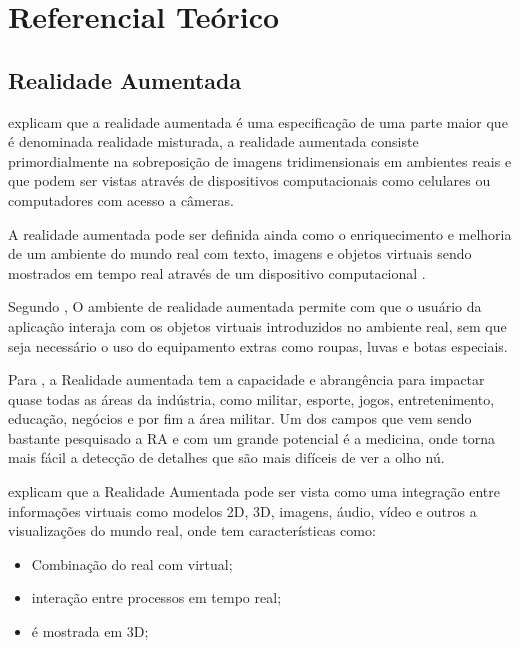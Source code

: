 \chapter{Referencial Teórico}\label{cap:referencial_teorico}

\section{Realidade Aumentada}
	 explicam que a realidade aumentada é uma especificação de uma parte maior que é denominada realidade misturada, a realidade aumentada consiste primordialmente na sobreposição de imagens tridimensionais em ambientes reais e que podem ser vistas através de dispositivos computacionais como celulares ou computadores com acesso a câmeras. 
	
	A realidade aumentada pode ser definida ainda como o enriquecimento e melhoria de um ambiente do mundo real com texto, imagens e objetos virtuais sendo mostrados em tempo real através de um dispositivo computacional \cite{kirner2007realidade}.
	
	Segundo , O ambiente de realidade aumentada permite com que o usuário da aplicação interaja com os objetos virtuais introduzidos no ambiente real, sem que seja necessário o uso do equipamento extras como roupas, luvas e botas especiais.
	
	Para , a Realidade aumentada tem a capacidade e abrangência para impactar  quase todas as áreas da indústria, como militar, esporte, jogos, entretenimento, educação, negócios e por fim a área militar. Um dos campos que vem sendo bastante pesquisado a RA e com um grande potencial é a medicina, onde torna mais fácil a detecção de detalhes que são mais difíceis de ver a olho nú.
	
	 explicam que a Realidade Aumentada pode ser vista como uma integração entre informações virtuais como modelos 2D, 3D, imagens, áudio, vídeo e outros a visualizações do mundo real, onde tem características como:  
	\begin{itemize}
		\item Combinação do real com virtual;
		\item interação entre processos em tempo real;
		\item é mostrada em 3D;
	\end{itemize}
	
